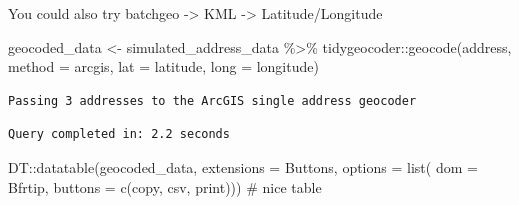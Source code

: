 \documentclass[
  letterpaper,
  DIV=11,
  numbers=noendperiod,
  oneside]{scrreprt}
\newenvironment{Shaded}{\begin{snugshade}}{\end{snugshade}}
\newcommand{\AttributeTok}[1]{\textcolor[rgb]{0.40,0.45,0.13}{#1}}
\newcommand{\CommentTok}[1]{\textcolor[rgb]{0.37,0.37,0.37}{#1}}
\newcommand{\FunctionTok}[1]{\textcolor[rgb]{0.28,0.35,0.67}{#1}}
\newcommand{\NormalTok}[1]{\textcolor[rgb]{0.00,0.23,0.31}{#1}}
\newcommand{\OtherTok}[1]{\textcolor[rgb]{0.00,0.23,0.31}{#1}}
\newcommand{\SpecialCharTok}[1]{\textcolor[rgb]{0.37,0.37,0.37}{#1}}
\newcommand{\StringTok}[1]{\textcolor[rgb]{0.13,0.47,0.30}{#1}}
\begin{document}
\begin{tcolorbox}[enhanced jigsaw, coltitle=black, breakable, leftrule=.75mm, opacityback=0, colback=white, bottomtitle=1mm, left=2mm, toptitle=1mm, toprule=.15mm, opacitybacktitle=0.6, rightrule=.15mm, titlerule=0mm, colframe=quarto-callout-tip-color-frame, bottomrule=.15mm, title=\textcolor{quarto-callout-tip-color}{\faLightbulb}\hspace{0.5em}{Tip}, colbacktitle=quarto-callout-tip-color!10!white, arc=.35mm]

You could also try batchgeo -\textgreater{} KML -\textgreater{}
Latitude/Longitude

\end{tcolorbox}

\begin{Shaded}
\begin{Highlighting}[]
\NormalTok{geocoded\_data }\OtherTok{\textless{}{-}}\NormalTok{ simulated\_address\_data }\SpecialCharTok{\%\textgreater{}\%} 
\NormalTok{  tidygeocoder}\SpecialCharTok{::}\FunctionTok{geocode}\NormalTok{(address, }
                        \AttributeTok{method =} \StringTok{\textquotesingle{}arcgis\textquotesingle{}}\NormalTok{, }
                        \AttributeTok{lat =}\NormalTok{ latitude, }
                        \AttributeTok{long =}\NormalTok{ longitude)}
\end{Highlighting}
\end{Shaded}

\begin{verbatim}
Passing 3 addresses to the ArcGIS single address geocoder
\end{verbatim}

\begin{verbatim}
Query completed in: 2.2 seconds
\end{verbatim}

\begin{Shaded}
\begin{Highlighting}[]
\NormalTok{DT}\SpecialCharTok{::}\FunctionTok{datatable}\NormalTok{(geocoded\_data,}
              \AttributeTok{extensions =} \StringTok{\textquotesingle{}Buttons\textquotesingle{}}\NormalTok{, }
              \AttributeTok{options =} \FunctionTok{list}\NormalTok{(}
                \AttributeTok{dom =} \StringTok{\textquotesingle{}Bfrtip\textquotesingle{}}\NormalTok{,}
                \AttributeTok{buttons =} \FunctionTok{c}\NormalTok{(}\StringTok{\textquotesingle{}copy\textquotesingle{}}\NormalTok{, }
                            \StringTok{\textquotesingle{}csv\textquotesingle{}}\NormalTok{, }
                            \StringTok{\textquotesingle{}print\textquotesingle{}}\NormalTok{))) }\CommentTok{\# nice table}
\end{Highlighting}
\end{Shaded}
\end{document}
